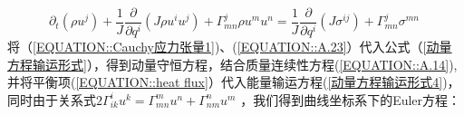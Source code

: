 \documentclass[LBMDerivation.tex]{subfiles}
\begin{document}
\begin{equation}
  \boxed{
    \partial_{t}\left(\rho u^{j}\right)+\frac{1}{J} \frac{\partial}{\partial q^{i}}\left(J \rho u^{i} u^{j} \right)+\Gamma_{mn}^{j} \rho u^{m} u^{n}
    = \frac{1}{J} \frac{\partial}{\partial q^{i}}\left(J \sigma^{ij} \right) + \Gamma_{mn}^{j} \sigma^{mn} }
  \label{动量方程输运形式} ~
\end{equation}
%
将（\ref{EQUATION::Cauchy应力张量1})、(\ref{EQUATION::A.23}）代入公式（\ref{动量方程输运形式}），得到动量守恒方程，结合质量连续性方程(\ref{EQUATION::A.14}), 并将平衡项(\ref{EQUATION::heat flux}）代入能量输运方程(\ref{动量方程输运形式4})，同时由于关系式$2\Gamma_{ik}^i u^k = \Gamma_{mn}^m u^n + \Gamma_{nm}^n u^m$
，我们得到曲线坐标系下的Euler方程：





\end{document}
